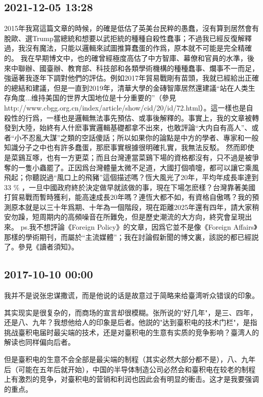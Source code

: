 \documentclass[twocolumn]{ctexart}
\begin{document}
\subsection*{2021-12-05 13:28}

2015年我寫這篇文章的時候，的確是低估了英美台民粹的愚蠢，沒有算到居然會有脫歐、選Trump當總統和想要以武拒統的種種自殺性蠢事；不過我已經反復解釋過，我沒有魔法，只能以邏輯來試圖推算蠢蛋的作爲，原本就不可能是完全精確的。
我在早期博文中，也的確曾經極度高估了中方智庫、幕僚和官員的水準，後來中聯辦、國臺辦、教育部、科技部和各類學術機構的種種蠢事、爛事不一而足，強逼著我逐年下調對他們的評估。例如2017年貿易戰剛有苗頭，我就已經給出正確的總結和建議，但是一直到2019年，清華大學的金磚智庫居然還建議“站在人类生存角度...维持美国的世界大国地位是十分重要的”（參見http://www.cbgg.org.cn/index/article/show/cid/20/id/72.html）。這一樣也是自殺性的行爲，一樣也是邏輯無法事先預估、或事後解釋的。事實上，我的文章被轉發到大陸，始終有人什麽事實邏輯基礎都拿不出來，也敢評論“大内自有高人”、或者“小不忍亂大謀”之類的空話傻話；所以如果你的論點是中方的學者、專家和一般知識分子之中也有許多蠢蛋，那麽事實根據很明確扎實，我無法反駁。
然而即使是菜鷄互啄，也有一方更菜；而且台灣連當菜鷄下場的資格都沒有，只不過是被爭奪的一隻小蟲罷了。正因爲台灣體量太微不足道，大國打個噴嚏，都可以讓它乘風飛起；你聽説過“風口上的飛豬”這個描述嗎？恆大風光了20年，平均年成長率達到33 \% ，一旦中國政府終於決定做早就該做的事，現在下場怎麽樣？台灣靠著美國打貿易戰而暫時獲利，能高速成長20年嗎？連恆大都不如，有資格自傲嗎？我的預測原本就是以三十年爲期、十年為一個階段，現在距離2025年還有四年，請大家稍安勿躁，短周期内的高頻噪音在所難免，但是歷史潮流的大方向，終究會呈現出來。
ps.我不想評論《Foreign Policy》的文章，因爲它並不是像《Foreign Affairs》那樣的學術期刊，而屬於“主流媒體”；我在討論假新聞的博文裏，該説的都已經説了。參見《讀者須知》。
\subsection*{2017-10-10 00:00}
我并不是说张忠谋撒谎，而是他说的话是故意过于简略来给臺湾听众错误的印象。

其实现实是很复杂的，而商场的宣言却很模糊。张所说的"好几年"，是三、四年，还是八、九年？我想他给人的印象是后者。他説的"达到臺积电的技术门栏"，是指挑战臺积电届时最尖端的技术，还是对臺积电的生意有实质的竞争影响？臺湾人的解读也同样偏向后者。

但是臺积电的生意不会全部是最尖端的制程（其实必然大部分都不是），八、九年后（可能在五年后就开始），中国的半导体制造公司必然会和臺积电在较老的制程上有激烈的竞争，对臺积电的营销和利润也因此会有明显的衝击。这才是我要强调的重点。
\end{document}

